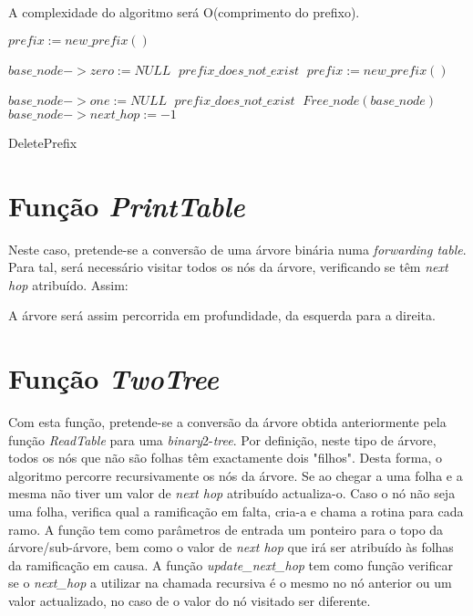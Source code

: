 \documentclass[twocolumn]{article}
\begin{document}
A complexidade do algoritmo será O(comprimento do prefixo). %

\begin{algorithmic}
 	\;
 \EndIf
 		\State $prefix:=new\_prefix()\;$
 		
 				\State $base\_node->zero:=NULL\;$
 			\EndIf
 		\Else
 			\State $prefix\_does\_not\_exist\;$
 			\;
 		\EndIf
 	\Else
 			\State $prefix:=new\_prefix()\;$
 		
 					\State $base\_node->one:=NULL\;$
 				\EndIf
 			\Else
 				\State $prefix\_does\_not\_exist\;$
 				\;
 			\EndIf
 		\EndIf
 	\EndIf
 \Else
 		\State $Free\_node(base\_node)\;$
 		\;
 	\Else
		\State $base\_node->next\_hop:=-1\;$	
 	\EndIf
 \EndIf
 \;
 \caption{DeletePrefix}
\end{algorithmic}
\section{Função \textit{PrintTable}}
Neste caso, pretende-se a conversão de uma árvore binária numa \textit{forwarding table}. Para tal, será necessário visitar todos os nós da árvore, verificando se têm \textit{next hop} atribuído. Assim:

\begin{algorithmic}
 \If{$has\_next\_hop$}{
	\State $print\_node\_prefix\_and\_next\_hop\;$
 \EndIf
 \If{$has\_"0"\_child$}
	\State $PrintTable(zero\_child)\;$
 \EndIf
 \If{$has\_"1"\_child$}
	\State $PrintTable(one\_child)\;$
 \EndIf
 
 \Return\;
 \caption{PrintTable}
\end{algorithmic}
A árvore será assim percorrida em profundidade, da esquerda para a direita.

\section{Função \textit{TwoTree}}
Com esta função, pretende-se a conversão da árvore obtida anteriormente pela função \textit{ReadTable} para uma \textit{binary}2-\textit{tree}. Por definição, neste tipo de árvore, todos os nós que não são folhas têm exactamente dois "filhos". Desta forma, o algoritmo percorre recursivamente os nós da árvore. Se ao chegar a uma folha e a mesma não tiver um valor de \textit{next hop} atribuído actualiza-o. Caso o nó não seja uma folha, verifica qual a ramificação em falta, cria-a e chama a rotina para cada ramo. A função tem como parâmetros de entrada um ponteiro para o topo da árvore/sub-árvore, bem como o valor de \textit{next hop} que irá ser atribuído às folhas da ramificação em  causa. A função \textit{update\_next\_hop} tem como função verificar se o \textit{next\_hop} a utilizar na chamada recursiva é o mesmo no nó anterior ou um valor actualizado, no caso de o valor do nó visitado ser diferente.
\end{document}
